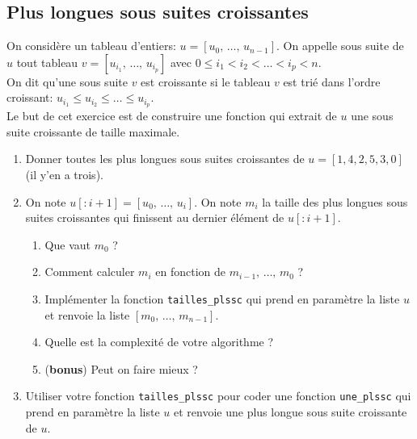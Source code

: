 \subsection{Plus longues sous suites croissantes}

On considère un tableau d'entiers: $u=[u_0,\, \dots,\, u_{n-1}]$. On appelle sous suite de $u$ tout tableau 
$v=[u_{i_1},\, \dots,\, u_{i_{p}}]$ avec $0 \leq i_1 < i_2 < \dots < i_p < n$.\\
On dit qu'une sous suite $v$ est croissante si le tableau 
$v$ est trié dans l'ordre croissant: $u_{i_1} \leq u_{i_2} \leq \dots \leq u_{i_p}$.\\
Le but de cet exercice est de construire une fonction qui extrait de $u$ une sous suite croissante de taille maximale.

\begin{enumerate}
\item Donner toutes les plus longues sous suites croissantes de $u=[1,4,2,5,3,0]$ (il y'en a trois).
\item On note $u[:i+1] = [u_0,\, \dots ,\, u_{i}]$. On note $m_i$ la taille des plus longues sous suites croissantes qui finissent au dernier élément de $u[:i+1]$.
	\begin{enumerate}
		\item Que vaut $m_0$ ?
		\item Comment calculer $m_i$ en fonction de $m_{i-1},\,\dots,\,m_0$ ?
		\item Implémenter la fonction \texttt{tailles\_plssc} qui prend en paramètre la liste $u$ et renvoie la liste $[m_0,\,\dots,\,m_{n-1}]$.
		\item Quelle est la complexité de votre algorithme ?
		\item (\textbf{bonus}) Peut on faire mieux ?	
	\end{enumerate}
\item Utiliser votre fonction \texttt{tailles\_plssc} pour coder une fonction \texttt{une\_plssc} qui prend en paramètre la liste $u$ et renvoie une plus longue sous suite croissante de $u$.
\end{enumerate}